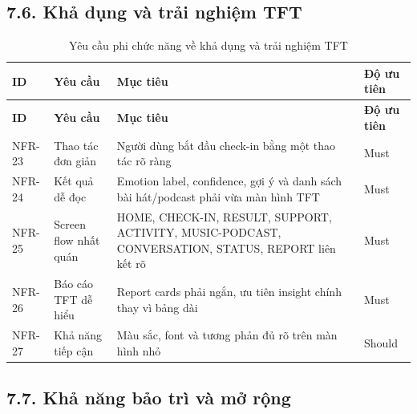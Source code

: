 \documentclass[12pt,a4paper]{article}
\begin{document}
\subsection*{7.6. Khả dụng và trải nghiệm TFT}

\begin{center}
\scriptsize
\begin{longtable}{|P{0.13\textwidth}|P{0.25\textwidth}|P{0.38\textwidth}|P{0.14\textwidth}|}
\caption{Yêu cầu phi chức năng về khả dụng và trải nghiệm TFT}\\
\hline
\textbf{ID} & \textbf{Yêu cầu} & \textbf{Mục tiêu} & \textbf{Độ ưu tiên} \\
\hline
\endfirsthead
\hline
\textbf{ID} & \textbf{Yêu cầu} & \textbf{Mục tiêu} & \textbf{Độ ưu tiên} \\
\hline
\endhead
NFR-23 & Thao tác đơn giản & Người dùng bắt đầu check-in bằng một thao tác rõ ràng & Must \\
\hline
NFR-24 & Kết quả dễ đọc & Emotion label, confidence, gợi ý và danh sách bài hát/podcast phải vừa màn hình TFT & Must \\
\hline
NFR-25 & Screen flow nhất quán & HOME, CHECK-IN, RESULT, SUPPORT, ACTIVITY, MUSIC-PODCAST, CONVERSATION, STATUS, REPORT liên kết rõ & Must \\
\hline
NFR-26 & Báo cáo TFT dễ hiểu & Report cards phải ngắn, ưu tiên insight chính thay vì bảng dài & Must \\
\hline
NFR-27 & Khả năng tiếp cận & Màu sắc, font và tương phản đủ rõ trên màn hình nhỏ & Should \\
\hline
\end{longtable}
\normalsize
\end{center}


\subsection*{7.7. Khả năng bảo trì và mở rộng}
\end{document}
